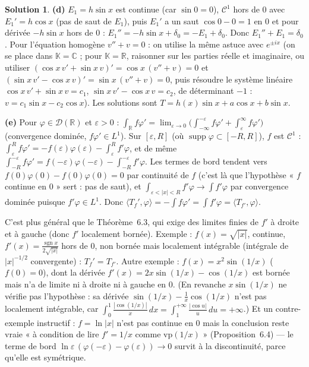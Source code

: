 \documentclass[11pt,a4paper]{article}
\newcommand{\R}{\mathbb{R}}
\newcommand{\C}{\mathbb{C}}
\newcommand{\K}{\mathbb{K}}
\DeclareMathOperator{\supp}{supp}
\DeclareMathOperator{\sgn}{sgn}
\newcommand{\D}{\mathcal{D}}
\theoremstyle{definition}
\newtheorem*{solution}{Solution}
\begin{document}
\begin{solution}
\medskip
\noindent\textbf{(d)} $E_1=h\sin x$ est continue (car $\sin0=0$), $\mathcal C^1$ hors de $0$ avec $E_1'=h\cos x$ (pas de saut de $E_1$), puis $E_1'$ a un saut $\cos0-0=1$ en $0$ et pour dérivée $-h\sin x$ hors de $0$ : $E_1''=-h\sin x+\delta_0=-E_1+\delta_0$. Donc $E_1''+E_1=\delta_0$. Pour l'équation homogène $v''+v=0$ : on utilise la même astuce avec $e^{\pm ix}$ (on se place dans $\K=\C$ ; pour $\K=\R$, raisonner sur les parties réelle et imaginaire, ou utiliser $(\cos x\,v'+\sin x\,v)'=\cos x\,(v''+v)=0$ et $(\sin x\,v'-\cos x\,v)'=\sin x\,(v''+v)=0$, puis résoudre le système linéaire $\cos x\,v'+\sin x\,v=c_1$, $\sin x\,v'-\cos x\,v=c_2$, de déterminant $-1$ : $v=c_1\sin x-c_2\cos x$). Les solutions sont $T=h(x)\sin x+a\cos x+b\sin x$.

\medskip
\noindent\textbf{(e)} Pour $\varphi\in\D(\R)$ et $\varepsilon>0$ : $\int_\R f\varphi'=\lim_{\varepsilon\to0}\big(\int_{-\infty}^{-\varepsilon}f\varphi'+\int_\varepsilon^\infty f\varphi'\big)$ (convergence dominée, $f\varphi'\in L^1$). Sur $[\varepsilon,R]$ (où $\supp\varphi\subset[-R,R]$), $f$ est $\mathcal C^1$ : $\int_\varepsilon^Rf\varphi'=-f(\varepsilon)\varphi(\varepsilon)-\int_\varepsilon^Rf'\varphi$, et de même $\int_{-R}^{-\varepsilon}f\varphi'=f(-\varepsilon)\varphi(-\varepsilon)-\int_{-R}^{-\varepsilon}f'\varphi$. Les termes de bord tendent vers $f(0)\varphi(0)-f(0)\varphi(0)=0$ par continuité de $f$ (c'est là que l'hypothèse « $f$ continue en $0$ » sert : pas de saut), et $\int_{\varepsilon<|x|<R}f'\varphi\to\int f'\varphi$ par convergence dominée puisque $f'\varphi\in L^1$. Donc $\langle T_f',\varphi\rangle=-\int f\varphi'=\int f'\varphi=\langle T_{f'},\varphi\rangle$.

C'est plus général que le Théorème~6.3, qui exige des limites finies de $f'$ à droite et à gauche (donc $f'$ localement bornée). Exemple : $f(x)=\sqrt{|x|}$, continue, $f'(x)=\frac{\sgn x}{2\sqrt{|x|}}$ hors de $0$, non bornée mais localement intégrable (intégrale de $|x|^{-1/2}$ convergente) : $T_f'=T_{f'}$. Autre exemple : $f(x)=x^2\sin(1/x)$ ($f(0)=0$), dont la dérivée $f'(x)=2x\sin(1/x)-\cos(1/x)$ est bornée mais n'a de limite ni à droite ni à gauche en $0$. (En revanche $x\sin(1/x)$ ne vérifie pas l'hypothèse : sa dérivée $\sin(1/x)-\frac1x\cos(1/x)$ n'est pas localement intégrable, car $\int_0^1\frac{|\cos(1/x)|}x\,dx=\int_1^{+\infty}\frac{|\cos u|}u\,du=+\infty$.) Et un contre-exemple instructif : $f=\ln|x|$ n'est pas continue en $0$ mais la conclusion reste vraie « à condition de lire $f'=1/x$ comme $\mathrm{vp}(1/x)$ » (Proposition~6.4) — le terme de bord $\ln\varepsilon\,(\varphi(-\varepsilon)-\varphi(\varepsilon))\to0$ survit à la discontinuité, parce qu'elle est symétrique.
\end{solution}
\end{document}
